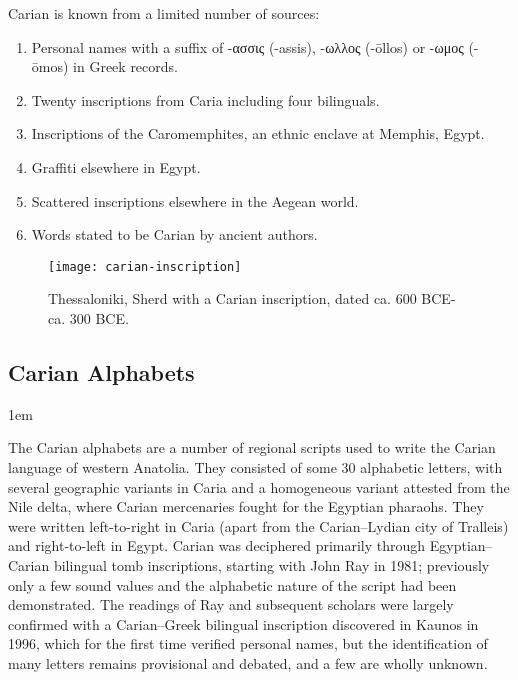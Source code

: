 Carian is known from a limited number of sources:

\begin{enumerate}
\item Personal names with a suffix of -ασσις (-assis), -ωλλος (-ōllos) or -ωμος (-ōmos) in Greek records.
\item Twenty inscriptions from Caria including four bilinguals.
\item Inscriptions of the Caromemphites, an ethnic enclave at Memphis, Egypt.
\item Graffiti elsewhere in Egypt.
\item Scattered inscriptions elsewhere in the Aegean world.
\item Words stated to be Carian by ancient authors.
\end{enumerate}


\begin{figure}[htbp]
\centering
\texttt{[image: carian-inscription]}
\caption[Thessaloniki, Sherd with a Carian inscription]{Thessaloniki, Sherd with a Carian inscription, dated ca. 600 BCE-ca. 300 BCE.} 

\end{figure}


\subsection{Carian Alphabets} 
\parindent1em
\parskip10pt


The Carian alphabets are a number of regional scripts used to write the Carian language of western Anatolia. They consisted of some 30 alphabetic letters, with several geographic variants in Caria and a homogeneous variant attested from the Nile delta, where Carian mercenaries fought for the Egyptian pharaohs. They were written left-to-right in Caria (apart from the Carian–Lydian city of Tralleis) and right-to-left in Egypt. Carian was deciphered primarily through Egyptian–Carian bilingual tomb inscriptions, starting with John Ray in 1981; previously only a few sound values and the alphabetic nature of the script had been demonstrated. The readings of Ray and subsequent scholars were largely confirmed with a Carian–Greek bilingual inscription discovered in Kaunos in 1996, which for the first time verified personal names, but the identification of many letters remains provisional and debated, and a few are wholly unknown.


